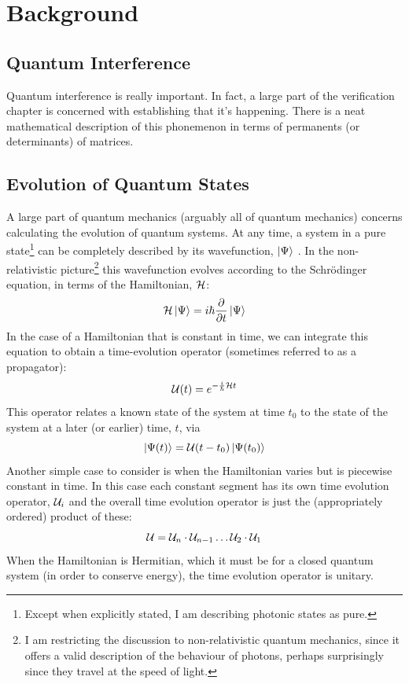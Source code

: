 \chapter{Background}
\label{ch:Background}
\section{Quantum Interference}
\label{sec:HOM}
Quantum interference is really important. In fact, a large part of the
verification chapter is concerned with establishing that it's happening. There
is a neat mathematical description of this phonemenon in terms of permanents (or
determinants) of matrices.

\section{Evolution of Quantum States}
\label{sec:Evolution}
A large part of quantum mechanics (arguably all of quantum mechanics) concerns
calculating the evolution of quantum systems. At any time, a system in a pure
state\footnote{Except when explicitly stated, I am describing photonic states as
pure.} can be completely described by
its wavefunction, \(\left|\Psi\right\rangle\) \cite{pbr}. In the non-relativistic
picture\footnote{I am restricting the discussion to non-relativistic quantum
mechanics, since it offers a valid description of the behaviour of photons,
perhaps surprisingly since they travel at the speed of light.} this
wavefunction evolves according to the Schr\"odinger equation, in terms of the
Hamiltonian, \(\mathcal{H}\):
\begin{equation}
  \mathcal{H} \left|\Psi\right\rangle = i \hbar \frac{\partial}{\partial t} \left|\Psi\right\rangle
\end{equation}
In the case of a Hamiltonian that is constant in time, we can integrate this
equation to obtain a time-evolution operator (sometimes referred to as a
propagator):
\begin{equation}
  \label{eq:expiht}
  \mathcal{U} \!\left(t\right) = e^{-\frac{i}{\hbar} \mathcal{H} t}
\end{equation}
This operator relates a known state of the system at time \(t_{0}\) to the state
of the system at a later (or earlier) time, \(t\), via
\begin{equation}
  \left| \Psi \!\left(t\right) \right\rangle = \mathcal{U} \!\left(t-t_{0}\right) \left| \Psi \!\left(t_{0}\right) \right\rangle
\end{equation}
Another simple case to consider is when the Hamiltonian varies but is piecewise
constant in time. In this case each constant segment has its own time evolution
operator, \(\mathcal{U}_{i}\) and  the overall time evolution operator is just the
(appropriately ordered) product of these:
\begin{equation}
  \mathcal{U} = \mathcal{U}_{n} \cdot \mathcal{U}_{n-1} \dots \mathcal{U}_{2} \cdot \mathcal{U}_{1}
\end{equation}
When the Hamiltonian is Hermitian, which it must be for a closed quantum system
(in order to conserve energy), the time evolution operator is unitary.

